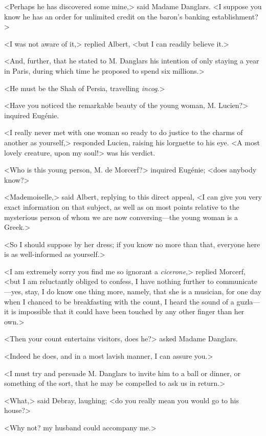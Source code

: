  <Perhaps he has discovered some mine,> said Madame Danglars. <I suppose you know he has an order for unlimited credit on the baron's banking establishment?> 

 <I was not aware of it,> replied Albert, <but I can readily believe it.> 

<And, further, that he stated to M. Danglars his intention of only staying a year in Paris, during which time he proposed to spend six millions.>

 <He must be the Shah of Persia, travelling \textit{incog}.> 

 <Have you noticed the remarkable beauty of the young woman, M. Lucien?> inquired Eugénie. 

 <I really never met with one woman so ready to do justice to the charms of another as yourself,> responded Lucien, raising his lorgnette to his eye. <A most lovely creature, upon my soul!> was his verdict. 

 <Who is this young person, M. de Morcerf?> inquired Eugénie; <does anybody know?> 

 <Mademoiselle,> said Albert, replying to this direct appeal, <I can give you very exact information on that subject, as well as on most points relative to the mysterious person of whom we are now conversing—the young woman is a Greek.> 

<So I should suppose by her dress; if you know no more than that, everyone here is as well-informed as yourself.> 

 <I am extremely sorry you find me so ignorant a \textit{cicerone},> replied Morcerf, <but I am reluctantly obliged to confess, I have nothing further to communicate—yes, stay, I do know one thing more, namely, that she is a musician, for one day when I chanced to be breakfasting with the count, I heard the sound of a guzla—it is impossible that it could have been touched by any other finger than her own.> 

 <Then your count entertains visitors, does he?> asked Madame Danglars. 

 <Indeed he does, and in a most lavish manner, I can assure you.> 

 <I must try and persuade M. Danglars to invite him to a ball or dinner, or something of the sort, that he may be compelled to ask us in return.> 

 <What,> said Debray, laughing; <do you really mean you would go to his house?> 

 <Why not? my husband could accompany me.> 

